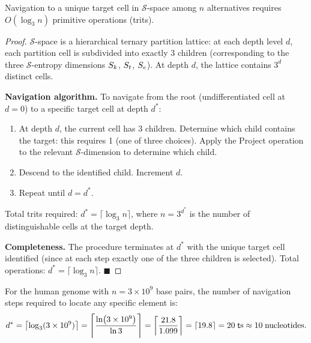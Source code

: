 \begin{theorem}
\label{thm:log3_complexity}
Navigation to a unique target cell in $\mathcal{S}$-space among $n$
alternatives requires $O(\log_3 n)$ primitive operations (trits).
\end{theorem}

\begin{proof}
$\mathcal{S}$-space is a hierarchical ternary partition lattice:
at each depth level $d$, each partition cell is subdivided into
exactly 3 children (corresponding to the three $\mathcal{S}$-entropy
dimensions $S_k$, $S_t$, $S_e$). At depth $d$, the lattice contains
$3^d$ distinct cells.

\textbf{Navigation algorithm.}
To navigate from the root (undifferentiated cell at $d = 0$) to a
specific target cell at depth $d^*$:
\begin{enumerate}
  \item At depth $d$, the current cell has 3 children. Determine
    which child contains the target: this requires 1 \trit{} (one
    of three choices). Apply the Project operation to the relevant
    $\mathcal{S}$-dimension to determine which child.
  \item Descend to the identified child. Increment $d$.
  \item Repeat until $d = d^*$.
\end{enumerate}
Total trits required: $d^* = \lceil \log_3 n \rceil$, where $n = 3^{d^*}$
is the number of distinguishable cells at the target depth.

\textbf{Completeness.} The procedure terminates at $d^*$ with the
unique target cell identified (since at each step exactly one of the
three children is selected). Total operations: $d^* = \lceil\log_3 n\rceil$.
$\blacksquare$
\end{proof}

\begin{corollary}
\label{cor:human_nav}
For the human genome with $n = 3\times 10^9$ base pairs, the number
of navigation steps required to locate any specific element is:
\begin{equation}
  d^* = \left\lceil \log_3(3\times 10^9) \right\rceil
      = \left\lceil \frac{\ln(3\times 10^9)}{\ln 3} \right\rceil
      = \left\lceil \frac{21.8}{1.099} \right\rceil
      = \lceil 19.8 \rceil
      = 20 \;\mathsf{t}{}\mathrm{s}
      \approx 10 \;\text{nucleotides}.
  \label{eq:human_nav}
\end{equation}
\end{corollary}

